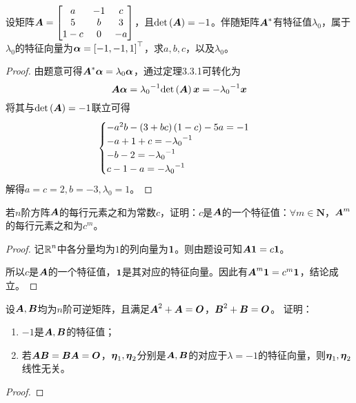 \begin{problem}
设矩阵\(\boldsymbol{A}=\begin{bmatrix}a&-1&c\\5&b&3\\1-c&0&-a\end{bmatrix}\)，且\(\mathrm{det}\left( \boldsymbol{A} \right)=-1\)。伴随矩阵\(\boldsymbol{A}^*\)有特征值\(\lambda_0\)，属于\(\lambda_0\)的特征向量为\(\boldsymbol{\alpha}=\left[ -1,-1,1 \right]^\top\)，求\(a,b,c\)，以及\(\lambda_0\)。
\end{problem}
\begin{proof}
    由题意可得\(\boldsymbol{A}^*\boldsymbol{\alpha}=\lambda_0\boldsymbol{\alpha}\)，通过定理3.3.1可转化为
    \begin{equation*}
        \boldsymbol{A}\boldsymbol{\alpha}={\lambda_0}^{-1}\mathrm{det}\left( \boldsymbol{A} \right)\boldsymbol{x}=-{\lambda_0}^{-1}\boldsymbol{x}
    \end{equation*}
    将其与\(\mathrm{det}\left( \boldsymbol{A} \right)=-1\)联立可得
    \begin{equation*}
        \begin{cases}
            -a^2b-\left( 3+bc \right)\left( 1-c \right)-5a=-1 \\
            -a+1+c=-{\lambda_0}^{-1}             \\
            -b-2=-{\lambda_0}^{-1}               \\
            c-1-a=-{\lambda_0}^{-1}
        \end{cases}
    \end{equation*}
    解得\(a=c=2,b=-3,\lambda_0=1\)。
\end{proof}

\begin{problem}
若\(n\)阶方阵\(\boldsymbol{A}\)的每行元素之和为常数\(c\)，证明：\(c\)是\(\boldsymbol{A}\)的一个特征值：\(\forall m\in\mathbf{N}\)，\(\boldsymbol{A}^m\)的每行元素之和为\(c^m\)。
\end{problem}
\begin{proof}
    记\(\boldsymbol{\mathbb{R}}^n\)中各分量均为\(1\)的列向量为\(\boldsymbol{1}\)。则由题设可知\(\boldsymbol{A}\boldsymbol{1}=c\boldsymbol{1}\)。

    所以\(c\)是\(\boldsymbol{A}\)的一个特征值，\(\boldsymbol{1}\)是其对应的特征向量。因此有\(\boldsymbol{A}^m\boldsymbol{1}=c^m\boldsymbol{1}\)，结论成立。
\end{proof}

\begin{problem}
设\(\boldsymbol{A},\boldsymbol{B}\)均为\(n\)阶可逆矩阵，且满足\(\boldsymbol{A}^2+\boldsymbol{A}=\boldsymbol{O}\)，\(\boldsymbol{B}^2+\boldsymbol{B}=\boldsymbol{O}\)。
证明：
\begin{enumerate}
    \item \(-1\)是\(\boldsymbol{A},\boldsymbol{B}\)的特征值；
    \item 若\(\boldsymbol{A}\boldsymbol{B}=\boldsymbol{B}\boldsymbol{A}=\boldsymbol{O}\)，\(\boldsymbol{\eta}_1,\boldsymbol{\eta}_2\)分别是\(\boldsymbol{A},\boldsymbol{B}\)的对应于\(\lambda=-1\)的特征向量，则\(\boldsymbol{\eta}_1,\boldsymbol{\eta}_2\)线性无关。
\end{enumerate}
\end{problem}
\begin{proof}
\end{proof}

